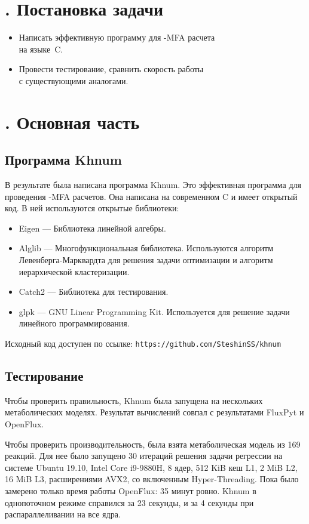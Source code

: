 \documentclass[14pt, a4paper]{extreport}
\newcommand{\CC}{C\nolinebreak\hspace{-.05em}\raisebox{.4ex}{\tiny\bf +}\nolinebreak\hspace{-.10em}\raisebox{.4ex}{\tiny\bf +}}
\def\CC{{C\nolinebreak[4]\hspace{-.05em}\raisebox{.4ex}{\tiny\bf ++}}} %
\begin{document}
\chapter[Постановка задачи]{\thechapter{}. Постановка задачи}
\begin{itemize}
	\item Написать эффективную программу для -MFA расчета \\на языке~\CC.
	\item Провести тестирование, сравнить скорость работы\\с существующими аналогами.
\end{itemize}

\chapter[Основная часть]{\thechapter{}. Основная часть}
\section{Программа Khnum}
В результате была написана программа Khnum. Это эффективная программа для проведения -MFA расчетов. Она написана на современном \CC{} и имеет открытый код. В ней используются открытые библиотеки:
\begin{itemize}
	\item Eigen --- Библиотека линейной алгебры.
	\item Alglib --- Многофункциональная библиотека. Используются алгоритм Левенберга-Марквардта для решения задачи оптимизации и алгоритм иерархической кластеризации.
	\item Catch2 --- Библиотека для тестирования.
	\item glpk --- GNU Linear Programming Kit. Используется для решение задачи линейного программирования.
\end{itemize}
Исходный код доступен по ссылке: \texttt{https://github.com/SteshinSS/khnum}

\section{Тестирование}
Чтобы проверить правильность, Khnum была запущена на нескольких метаболических моделях. Результат вычислений совпал с результатами FluxPyt и OpenFlux.

Чтобы проверить производительность, была взята метаболическая модель из 169 реакций. Для нее было запущено 30 итераций решения задачи регрессии на системе Ubuntu 19.10, Intel Core i9-9880H, 8 ядер, 512 KiB кеш L1, 2 MiB L2, 16 MiB L3, расширениями AVX2, со включенным Hyper-Threading. Пока было замерено только время работы OpenFlux: 35 минут ровно. Khnum в однопоточном режиме справился за 23 секунды, и за 4 секунды при распараллеливании на все ядра.
\end{document}

